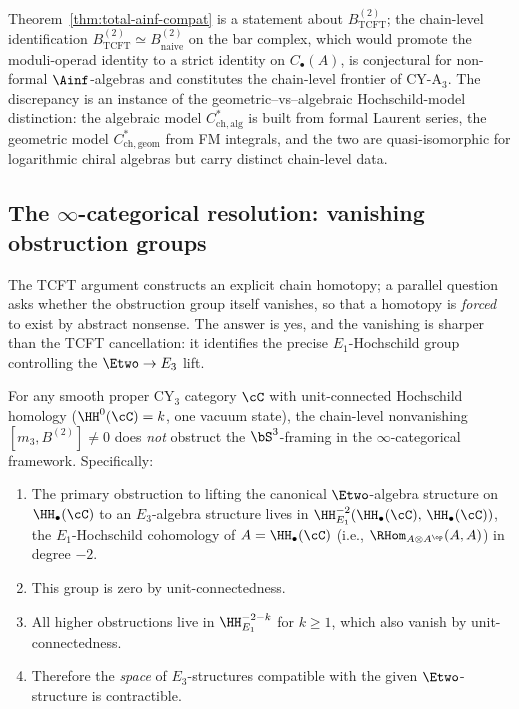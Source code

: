 \begin{remark}
Theorem~\ref{thm:total-ainf-compat} is a statement about
$B^{(2)}_{\mathrm{TCFT}}$; the chain-level identification
$B^{(2)}_{\mathrm{TCFT}} \simeq B^{(2)}_{\mathrm{naive}}$ on the
bar complex, which would promote the moduli-operad identity to a
strict identity on $C_\bullet(A)$, is conjectural for non-formal
$\Ainf$-algebras and constitutes the chain-level frontier of
CY-A$_3$.  The discrepancy is an instance of the
geometric--vs--algebraic Hochschild-model distinction: the
algebraic model $C^*_{\mathrm{ch,alg}}$ is built from formal
Laurent series, the geometric model $C^*_{\mathrm{ch,geom}}$ from
FM integrals, and the two are quasi-isomorphic for logarithmic
chiral algebras but carry distinct chain-level data.
\end{remark}


\subsection{The $\infty$-categorical resolution: vanishing
obstruction groups}
\label{subsec:infty-cat-resolution}

The TCFT argument constructs an explicit chain homotopy; a parallel
question asks whether the obstruction group itself vanishes, so
that a homotopy is \emph{forced} to exist by abstract nonsense.
The answer is yes, and the vanishing is sharper than the TCFT
cancellation: it identifies the precise
$E_1$-Hochschild group controlling the $\Etwo \to E_3$ lift.

\begin{theorem}
\label{thm:derived-framing-m3b2}
\ClaimStatusProvedHere{}
For any smooth proper CY$_3$ category $\cC$ with unit-connected
Hochschild homology ($\HH^0(\cC) = k$, one vacuum state), the
chain-level nonvanishing $[m_3, B^{(2)}] \neq 0$ does \emph{not}
obstruct the $\bS^3$-framing in the $\infty$-categorical framework.
Specifically:
\begin{enumerate}[label=\textup{(\roman*)}]
 \item The primary obstruction to lifting the canonical
  $\Etwo$-algebra structure on $\HH_\bullet(\cC)$ to an
  $E_3$-algebra structure lives in
  $\HH^{-2}_{E_1}(\HH_\bullet(\cC),\, \HH_\bullet(\cC))$,
  the $E_1$-Hochschild cohomology of $A = \HH_\bullet(\cC)$
  (i.e., $\RHom_{A \otimes A^{\op}}(A, A)$) in degree $-2$.
 \item This group is zero by unit-connectedness.
 \item All higher obstructions live in
  $\HH^{-2-k}_{E_1}$ for $k \geq 1$, which also vanish by
  unit-connectedness.
 \item Therefore the \emph{space} of $E_3$-structures
  compatible with the given $\Etwo$-structure is contractible.
\end{enumerate}
\end{theorem}

